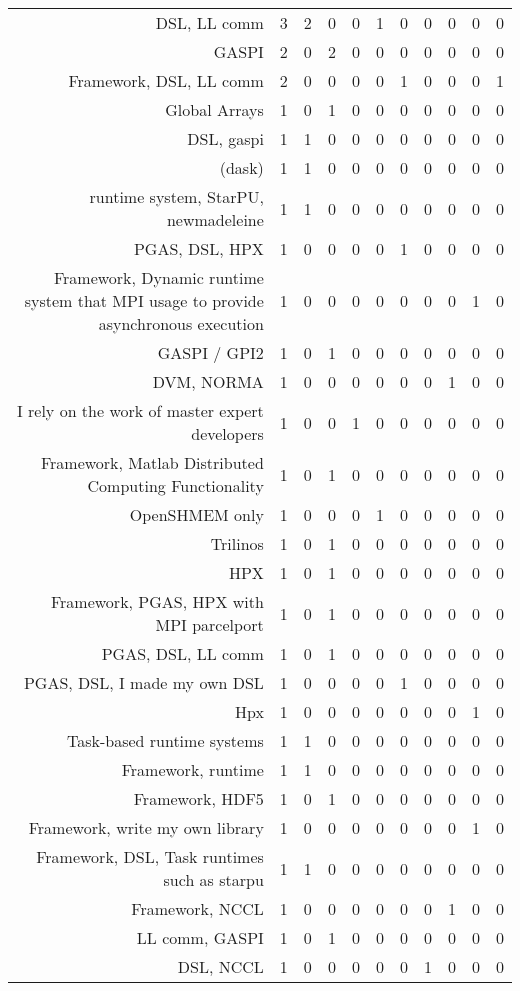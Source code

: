 {\begin{landscape}
\begin{longtable}[htb]{r|c|c|c|c|c|c|c|c|c|c}
{DSL, LL comm} & 3 & 2 & 0 & 0 & 1 & 0 & 0 & 0 & 0 & 0 \\%
{GASPI} & 2 & 0 & 2 & 0 & 0 & 0 & 0 & 0 & 0 & 0 \\%
{Framework, DSL, LL comm} & 2 & 0 & 0 & 0 & 0 & 1 & 0 & 0 & 0 & 1 \\%
{Global Arrays} & 1 & 0 & 1 & 0 & 0 & 0 & 0 & 0 & 0 & 0 \\%
{DSL, gaspi} & 1 & 1 & 0 & 0 & 0 & 0 & 0 & 0 & 0 & 0 \\%
{(dask)} & 1 & 1 & 0 & 0 & 0 & 0 & 0 & 0 & 0 & 0 \\%
{runtime system, StarPU, newmadeleine} & 1 & 1 & 0 & 0 & 0 & 0 & 0 & 0 & 0 & 0 \\%
{PGAS, DSL, HPX} & 1 & 0 & 0 & 0 & 0 & 1 & 0 & 0 & 0 & 0 \\%
{Framework, Dynamic runtime system that MPI usage to provide asynchronous execution} & 1 & 0 & 0 & 0 & 0 & 0 & 0 & 0 & 1 & 0 \\%
{GASPI / GPI2} & 1 & 0 & 1 & 0 & 0 & 0 & 0 & 0 & 0 & 0 \\%
{DVM, NORMA} & 1 & 0 & 0 & 0 & 0 & 0 & 0 & 1 & 0 & 0 \\%
{I rely on the work of master expert developers} & 1 & 0 & 0 & 1 & 0 & 0 & 0 & 0 & 0 & 0 \\%
{Framework, Matlab Distributed Computing Functionality} & 1 & 0 & 1 & 0 & 0 & 0 & 0 & 0 & 0 & 0 \\%
{OpenSHMEM only} & 1 & 0 & 0 & 0 & 1 & 0 & 0 & 0 & 0 & 0 \\%
{Trilinos} & 1 & 0 & 1 & 0 & 0 & 0 & 0 & 0 & 0 & 0 \\%
{HPX} & 1 & 0 & 1 & 0 & 0 & 0 & 0 & 0 & 0 & 0 \\%
{Framework, PGAS, HPX with MPI parcelport} & 1 & 0 & 1 & 0 & 0 & 0 & 0 & 0 & 0 & 0 \\%
{PGAS, DSL, LL comm} & 1 & 0 & 1 & 0 & 0 & 0 & 0 & 0 & 0 & 0 \\%
{PGAS, DSL, I made my own DSL} & 1 & 0 & 0 & 0 & 0 & 1 & 0 & 0 & 0 & 0 \\%
{Hpx} & 1 & 0 & 0 & 0 & 0 & 0 & 0 & 0 & 1 & 0 \\%
{Task-based runtime systems} & 1 & 1 & 0 & 0 & 0 & 0 & 0 & 0 & 0 & 0 \\%
{Framework, runtime} & 1 & 1 & 0 & 0 & 0 & 0 & 0 & 0 & 0 & 0 \\%
{Framework, HDF5} & 1 & 0 & 1 & 0 & 0 & 0 & 0 & 0 & 0 & 0 \\%
{Framework, write my own library} & 1 & 0 & 0 & 0 & 0 & 0 & 0 & 0 & 1 & 0 \\%
{Framework, DSL, Task runtimes such as starpu} & 1 & 1 & 0 & 0 & 0 & 0 & 0 & 0 & 0 & 0 \\%
{Framework, NCCL} & 1 & 0 & 0 & 0 & 0 & 0 & 0 & 1 & 0 & 0 \\%
{LL comm, GASPI} & 1 & 0 & 1 & 0 & 0 & 0 & 0 & 0 & 0 & 0 \\%
{DSL, NCCL} & 1 & 0 & 0 & 0 & 0 & 0 & 1 & 0 & 0 & 0 \\%
\hline%
\end{longtable}%
\end{landscape}}%
\clearpage%
